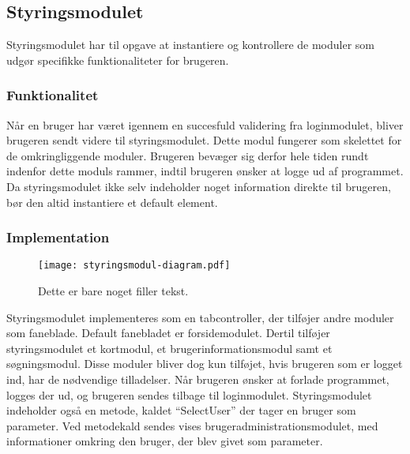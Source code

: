 \subsection{Styringsmodulet}
\label{sub:styringsmodul}

Styringsmodulet har til opgave at instantiere og kontrollere de moduler som udgør specifikke funktionaliteter for brugeren.

\subsubsection{Funktionalitet}
\label{ssub:hovedmodul_funktionalitet}

Når en bruger har været igennem en succesfuld validering fra loginmodulet, bliver brugeren sendt videre til styringsmodulet. Dette modul fungerer som skelettet for de omkringliggende moduler. Brugeren bevæger sig derfor hele tiden rundt indenfor dette moduls rammer, indtil brugeren ønsker at logge ud af programmet. Da styringsmodulet ikke selv indeholder noget information direkte til brugeren, bør den altid instantiere et default element.

\subsubsection{Implementation}
\label{ssub:hovedmodul_implementation}

\begin{figure}
  \centering
  \texttt{[image: styringsmodul-diagram.pdf]}
  \caption{Dette er bare noget filler tekst.}
\end{figure}

Styringsmodulet implementeres som en tabcontroller, der tilføjer andre moduler som faneblade. Default fanebladet er forsidemodulet. Dertil tilføjer styringsmodulet et kortmodul, et brugerinformationsmodul samt et søgningsmodul. Disse moduler bliver dog kun tilføjet, hvis brugeren som er logget ind, har de nødvendige tilladelser. Når brugeren ønsker at forlade programmet, logges der ud, og brugeren sendes tilbage til loginmodulet. Styringsmodulet indeholder også en metode, kaldet \enquote{SelectUser} der tager en bruger som parameter. Ved metodekald sendes vises brugeradministrationsmodulet, med informationer omkring den bruger, der blev givet som parameter. 